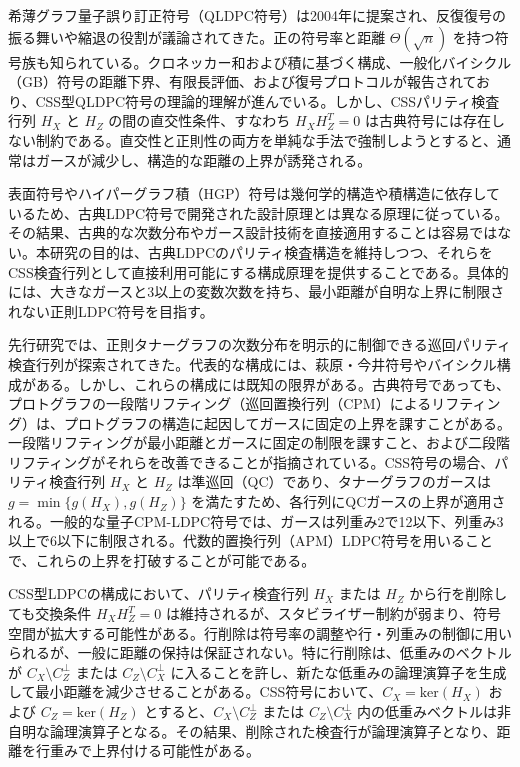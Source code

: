 \documentclass[a4paper,11pt,dvipdfmx]{jsarticle}
\theoremstyle{definition}
\begin{document}
希薄グラフ量子誤り訂正符号（QLDPC符号）は2004年に提案され、反復復号の振る舞いや縮退の役割が議論されてきた。正の符号率と距離 $\Theta(\sqrt{n})$ を持つ符号族も知られている。クロネッカー和および積に基づく構成、一般化バイシクル（GB）符号の距離下界、有限長評価、および復号プロトコルが報告されており、CSS型QLDPC符号の理論的理解が進んでいる。しかし、CSSパリティ検査行列 $H_X$ と $H_Z$ の間の直交性条件、すなわち $H_X H_Z^T = 0$ は古典符号には存在しない制約である。直交性と正則性の両方を単純な手法で強制しようとすると、通常はガースが減少し、構造的な距離の上界が誘発される。

表面符号やハイパーグラフ積（HGP）符号は幾何学的構造や積構造に依存しているため、古典LDPC符号で開発された設計原理とは異なる原理に従っている。その結果、古典的な次数分布やガース設計技術を直接適用することは容易ではない。本研究の目的は、古典LDPCのパリティ検査構造を維持しつつ、それらをCSS検査行列として直接利用可能にする構成原理を提供することである。具体的には、大きなガースと3以上の変数次数を持ち、最小距離が自明な上界に制限されない正則LDPC符号を目指す。

先行研究では、正則タナーグラフの次数分布を明示的に制御できる巡回パリティ検査行列が探索されてきた。代表的な構成には、萩原・今井符号やバイシクル構成がある。しかし、これらの構成には既知の限界がある。古典符号であっても、プロトグラフの一段階リフティング（巡回置換行列（CPM）によるリフティング）は、プロトグラフの構造に起因してガースに固定の上界を課すことがある。一段階リフティングが最小距離とガースに固定の制限を課すこと、および二段階リフティングがそれらを改善できることが指摘されている。CSS符号の場合、パリティ検査行列 $H_X$ と $H_Z$ は準巡回（QC）であり、タナーグラフのガースは $g = \min\{g(H_X), g(H_Z)\}$ を満たすため、各行列にQCガースの上界が適用される。一般的な量子CPM-LDPC符号では、ガースは列重み2で12以下、列重み3以上で6以下に制限される。代数的置換行列（APM）LDPC符号を用いることで、これらの上界を打破することが可能である。

CSS型LDPCの構成において、パリティ検査行列 $H_X$ または $H_Z$ から行を削除しても交換条件 $H_X H_Z^T = 0$ は維持されるが、スタビライザー制約が弱まり、符号空間が拡大する可能性がある。行削除は符号率の調整や行・列重みの制御に用いられるが、一般に距離の保持は保証されない。特に行削除は、低重みのベクトルが $C_X \setminus C_Z^\perp$ または $C_Z \setminus C_X^\perp$ に入ることを許し、新たな低重みの論理演算子を生成して最小距離を減少させることがある。CSS符号において、$C_X = \text{ker}(H_X)$ および $C_Z = \text{ker}(H_Z)$ とすると、$C_X \setminus C_Z^\perp$ または $C_Z \setminus C_X^\perp$ 内の低重みベクトルは非自明な論理演算子となる。その結果、削除された検査行が論理演算子となり、距離を行重みで上界付ける可能性がある。
\end{document}
